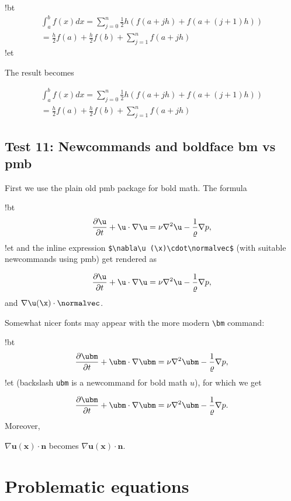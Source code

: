 \documentclass[%
oneside,                 %
final,                   %
10pt]{article}
\begin{document}
\blatexcod
!bt
\begin{equation}
\begin{split}
\int_a^b f(x)dx = \sum_{j=0}^{n} \frac{1}{2} h(f(a+jh) +
f(a+(j+1)h)) \\ 
=\frac{h}{2}f(a) + \frac{h}{2}f(b) + \sum_{j=1}^n f(a+jh)
\end{split}
\end{equation}
!et
\elatexcod

The result becomes

\begin{equation}
\begin{split}
\int_a^b f(x)dx = \sum_{j=0}^{n} \frac{1}{2} h(f(a+jh) +
f(a+(j+1)h)) \\ 
=\frac{h}{2}f(a) + \frac{h}{2}f(b) + \sum_{j=1}^n f(a+jh)
\end{split}
\end{equation}

\subsection{Test 11: Newcommands and boldface bm vs pmb}

First we use the plain old pmb package for bold math. The formula

\blatexcod
!bt
\[ \frac{\partial\u}{\partial t} +
\u\cdot\nabla\u = \nu\nabla^2\u -
\frac{1}{\varrho}\nabla p,\]
!et
\elatexcod
and the inline expression \Verb!$\nabla\u (\x)\cdot\normalvec$!
(with suitable newcommands using pmb)
get rendered as

\[ \frac{\partial\u}{\partial t} +
\u\cdot\nabla\u = \nu\nabla^2\u -
\frac{1}{\varrho}\nabla p,\]
and $\nabla\u (\x)\cdot\normalvec$.

Somewhat nicer fonts may appear with the more modern \Verb!\bm! command:

\blatexcod
!bt
\[ \frac{\partial\ubm}{\partial t} +
\ubm\cdot\nabla\ubm = \nu\nabla^2\ubm -
\frac{1}{\varrho}\nabla p,\]
!et
\elatexcod
(backslash \texttt{ubm} is a newcommand for bold math $u$), for which we get

\[ \frac{\partial\ubm}{\partial t} +
\ubm\cdot\nabla\ubm = \nu\nabla^2\ubm -
\frac{1}{\varrho}\nabla p.\]
Moreover,

\bccq
$\nabla\bm{u}(\bm{x})\cdot\bm{n}$
\eccq
becomes $\nabla\bm{u}(\bm{x})\cdot\bm{n}$.

\section{Problematic equations}
\end{document}
